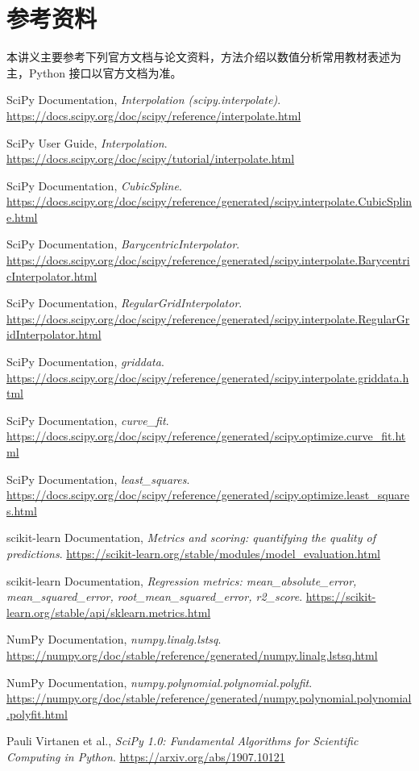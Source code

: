 \documentclass[11pt,a4paper]{ctexart}
\begin{document}
\section{参考资料}

本讲义主要参考下列官方文档与论文资料，方法介绍以数值分析常用教材表述为主，Python 接口以官方文档为准。

\begin{enumerate}[label={[\arabic*]}]
  \item SciPy Documentation, \emph{Interpolation (scipy.interpolate)}. \url{https://docs.scipy.org/doc/scipy/reference/interpolate.html}
  \item SciPy User Guide, \emph{Interpolation}. \url{https://docs.scipy.org/doc/scipy/tutorial/interpolate.html}
  \item SciPy Documentation, \emph{CubicSpline}. \url{https://docs.scipy.org/doc/scipy/reference/generated/scipy.interpolate.CubicSpline.html}
  \item SciPy Documentation, \emph{BarycentricInterpolator}. \url{https://docs.scipy.org/doc/scipy/reference/generated/scipy.interpolate.BarycentricInterpolator.html}
  \item SciPy Documentation, \emph{RegularGridInterpolator}. \url{https://docs.scipy.org/doc/scipy/reference/generated/scipy.interpolate.RegularGridInterpolator.html}
  \item SciPy Documentation, \emph{griddata}. \url{https://docs.scipy.org/doc/scipy/reference/generated/scipy.interpolate.griddata.html}
  \item SciPy Documentation, \emph{curve\_fit}. \url{https://docs.scipy.org/doc/scipy/reference/generated/scipy.optimize.curve_fit.html}
  \item SciPy Documentation, \emph{least\_squares}. \url{https://docs.scipy.org/doc/scipy/reference/generated/scipy.optimize.least_squares.html}
  \item scikit-learn Documentation, \emph{Metrics and scoring: quantifying the quality of predictions}. \url{https://scikit-learn.org/stable/modules/model_evaluation.html}
  \item scikit-learn Documentation, \emph{Regression metrics: mean\_absolute\_error, mean\_squared\_error, root\_mean\_squared\_error, r2\_score}. \url{https://scikit-learn.org/stable/api/sklearn.metrics.html}
  \item NumPy Documentation, \emph{numpy.linalg.lstsq}. \url{https://numpy.org/doc/stable/reference/generated/numpy.linalg.lstsq.html}
  \item NumPy Documentation, \emph{numpy.polynomial.polynomial.polyfit}. \url{https://numpy.org/doc/stable/reference/generated/numpy.polynomial.polynomial.polyfit.html}
  \item Pauli Virtanen et al., \emph{SciPy 1.0: Fundamental Algorithms for Scientific Computing in Python}. \url{https://arxiv.org/abs/1907.10121}
\end{enumerate}
\end{document}

